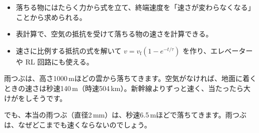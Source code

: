 \newcommand\bkvifL[2]{\begin{scope}[shift={#1}, rotate=#2]
  \fill[white] (-5.2,-0.6) rectangle (5.2,3.0);
  \draw[bkInk, line width=0.7pt] (-5,0) arc (180:0:1.25) arc (180:0:1.25) arc (180:0:1.25) arc (180:0:1.25);\end{scope}}
\newcommand\bkvifE[2]{\begin{scope}[shift={#1}, rotate=#2]
  \fill[white] (-1.2,-4.2) rectangle (1.2,4.2);
  \draw[bkInk, line width=0.7pt] (-1.0,-4.0) -- (-1.0,4.0);
  \draw[bkInk, line width=1.8pt] (1.0,-2.0) -- (1.0,2.0);\end{scope}}
\newcommand\bkvifS[2]{\begin{scope}[shift={#1}, rotate=#2]
  \fill[white] (-3.5,-0.6) rectangle (3.5,3.6);
  \fill[bkInk] (-3,0) circle (0.6) (3,0) circle (0.6);
  \draw[bkInk, line width=0.8pt] (-3,0) -- (2.6,3.0);\end{scope}}
\makeatother


\begin{goal}
\begin{itemize}[label={\color{\bkTT}●}, leftmargin=1.6\zw, itemsep=0pt, topsep=1pt]
\item {}\enspace 落ちる物にはたらく力から式を立て、終端速度を「速さが変わらなくなる」ことから求められる。
\item {}\enspace 表計算で、空気の抵抗を受けて落ちる物の速さを計算できる。
\item {}\enspace 速さに比例する抵抗の式を解いて $v=v_{\mathrm f}(1-e^{-t/\tau})$ を作り、エレベーターや RL 回路にも使える。
\end{itemize}
\end{goal}

\begin{hatena}
\noindent\begin{minipage}[c]{0.62\linewidth}\raggedright
雨つぶは、高さ1000\,mほどの雲から落ちてきます。空気がなければ、地面に着くときの速さは秒速140\,m（時速504\,km）。新幹線よりずっと速く、当たったら大けがをしそうです。

でも、本当の雨つぶ（直径2\,mm）は、秒速6.5\,mほどで落ちてきます。雨つぶは、なぜどこまでも速くならないのでしょう。
\end{minipage}\hfill
\begin{minipage}[c]{0.35\linewidth}\centering
{}
\end{minipage}
\end{hatena}

